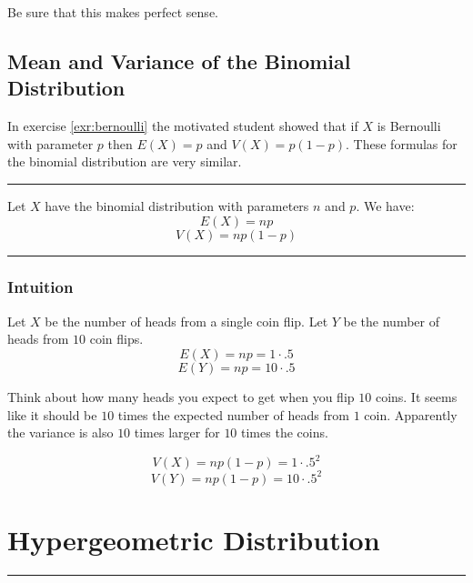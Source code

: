 \documentclass[
]{book}
\theoremstyle{definition}
\theoremstyle{definition}
\theoremstyle{definition}
\theoremstyle{remark}
\let\BeginKnitrBlock\begin \let\EndKnitrBlock\end
\begin{document}
Be sure that this makes perfect sense.

\hypertarget{mean-and-variance-of-the-binomial-distribution}{%
\subsection{Mean and Variance of the Binomial Distribution}\label{mean-and-variance-of-the-binomial-distribution}}

In exercise \ref{exr:bernoulli} the motivated student showed that if \(X\) is Bernoulli with parameter \(p\) then \(E(X) = p\) and \(V(X) = p(1-p)\). These formulas for the binomial distribution are very similar.

\begin{center}\rule{0.5\linewidth}{0.5pt}\end{center}

\BeginKnitrBlock{theorem}[Binomial Distribution]
\protect\hypertarget{thm:unnamed-chunk-21}{}{\label{thm:unnamed-chunk-21} {} }Let \(X\) have the binomial distribution with parameters \(n\) and \(p\). We have:
\[E(X) = np\]
\[V(X) = np(1-p)\]
\EndKnitrBlock{theorem}

\begin{center}\rule{0.5\linewidth}{0.5pt}\end{center}

\hypertarget{intuition}{%
\subsubsection{Intuition}\label{intuition}}

Let \(X\) be the number of heads from a single coin flip. Let \(Y\) be the number of heads from \(10\) coin flips.
\[E(X)=np=1 \cdot .5\]
\[E(Y)=np=10 \cdot .5\]

Think about how many heads you expect to get when you flip \(10\) coins. It seems like it should be \(10\) times the expected number of heads from \(1\) coin. Apparently the variance is also \(10\) times larger for \(10\) times the coins.

\[V(X)=np(1-p)=1 \cdot .5^2\]
\[V(Y)=np(1-p)=10 \cdot .5^2\]

\hypertarget{hypergeometric-distribution}{%
\section{Hypergeometric Distribution}\label{hypergeometric-distribution}}

\begin{center}\rule{0.5\linewidth}{0.5pt}\end{center}
\end{document}
